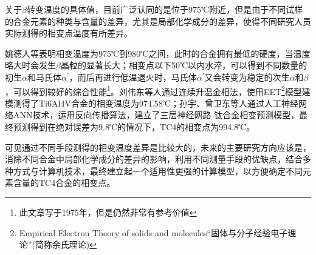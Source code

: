 \documentclass[
class = book,
zihao = -4,
font = noto,
paper = a4paper,
openany
]{easybook}
\newcommand{\ti}{Ti6Al4V}
\begin{document}
关于$\beta$转变温度的具体值，目前广泛认同的是位于975℃附近，但是由于不同试样的合金元素的种类与含量的差异，尤其是局部化学成分的差异，使得不同研究人员实际测得的相变点温度有所差异\cite{wangtaoTC4hejinxiangbianwendujiancezhongjieguobuyizhiyuanyinfenxi2013}。

姚德人等\cite{yaoderenTc4taihejinxiangbiandiandeceding1975}表明相变温度为975℃到980℃之间，此时的合金拥有最低的硬度，当温度略大时会发生$\beta$晶粒的显著长大；相变点以下50℃以内水淬，可以得到不同数量的初生$ \alpha $和马氏体$ \alpha^{'} $，而后再进行低温退火时，马氏体$ \alpha^{'} $又会转变为稳定的次生$ \alpha$和$ \beta $，可以得到较好的综合性能\footnote{\color{red}此文章写于1975年，但是仍然非常有参考价值}。刘伟东等人\cite{liuweidongTC4hejinVzhuanbianwendudejinxiangfacedingyulilunjisuan2014}通过连续升温金相法，使用EET\footnote{Empirical Electron Theory of solids and molecules“固体与分子经验电子理论”(简称余氏理论)}模型建模测得了\ti 合金的相变温度为974.58℃；孙宇、曾卫东等人\cite{sunyuYingyongrengongshenjingwangluoyanjiuhuaxueyuansuduitaihejinxiangbiandiandeyingxiang2010}通过人工神经网络ANN技术，运用反向传播算法，建立了三层神经网路-钛合金相变预测模型，最终预测得到在绝对误差为9.8℃的情况下，TC4的相变点为994.8℃。

可见通过不同手段测得的相变温度差异是比较大的，未来的主要研究方向应该是，消除不同合金中局部化学成分的差异的影响，利用不同测量手段的优缺点，结合多种方式与计算机技术，最终建立起一个适用性更强的计算模型，以方便确定不同元素含量的TC4合金的相变点。
\end{document}
